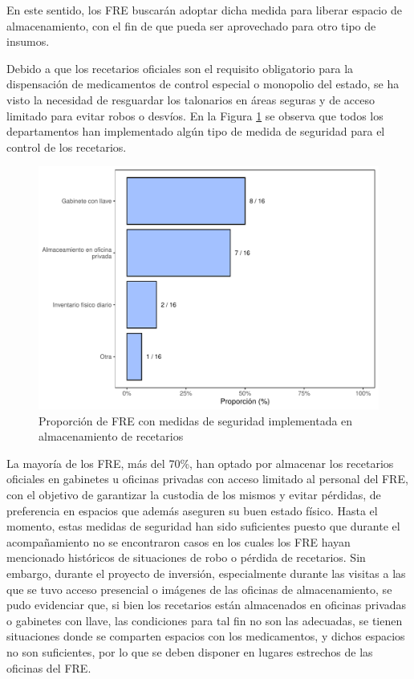 \documentclass[
]{book}
\begin{document}
En este sentido, los FRE buscarán adoptar dicha medida para liberar espacio de almacenamiento, con el fin de que pueda ser aprovechado para otro tipo de insumos.

Debido a que los recetarios oficiales son el requisito obligatorio para la dispensación de medicamentos de control especial o monopolio del estado, se ha visto la necesidad de resguardar los talonarios en áreas seguras y de acceso limitado para evitar robos o desvíos. En la Figura \ref{fig:MedidasSeguridad-Almacenamiento} se observa que todos los departamentos han implementado algún tipo de medida de seguridad para el control de los recetarios.

\begin{figure}

{\centering \includegraphics[width=0.85\linewidth]{InformeFinal_files/figure-latex/MedidasSeguridad-Almacenamiento-1} 

}

\caption{Proporción de FRE con medidas de seguridad implementada en almacenamiento de recetarios}\label{fig:MedidasSeguridad-Almacenamiento}
\end{figure}

La mayoría de los FRE, más del 70\%, han optado por almacenar los recetarios oficiales en gabinetes u oficinas privadas con acceso limitado al personal del FRE, con el objetivo de garantizar la custodia de los mismos y evitar pérdidas, de preferencia en espacios que además aseguren su buen estado físico. Hasta el momento, estas medidas de seguridad han sido suficientes puesto que durante el acompañamiento no se encontraron casos en los cuales los FRE hayan mencionado históricos de situaciones de robo o pérdida de recetarios. Sin embargo, durante el proyecto de inversión, especialmente durante las visitas a las que se tuvo acceso presencial o imágenes de las oficinas de almacenamiento, se pudo evidenciar que, si bien los recetarios están almacenados en oficinas privadas o gabinetes con llave, las condiciones para tal fin no son las adecuadas, se tienen situaciones donde se comparten espacios con los medicamentos, y dichos espacios no son suficientes, por lo que se deben disponer en lugares estrechos de las oficinas del FRE.
\end{document}
